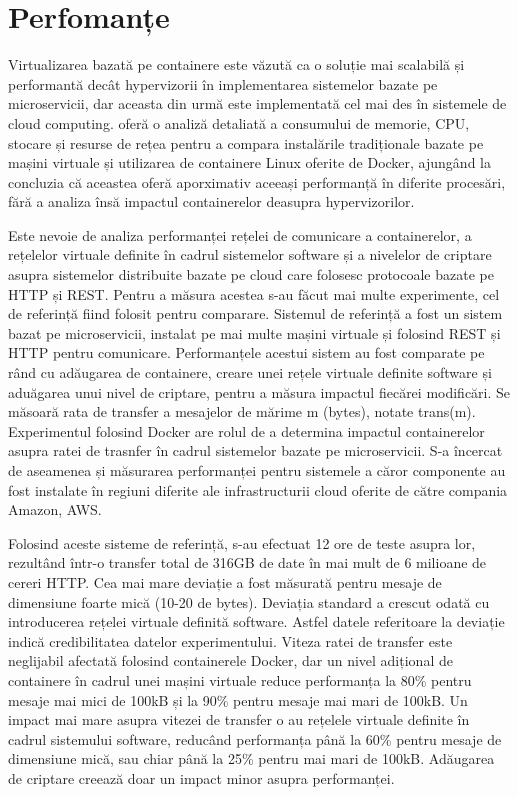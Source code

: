 \documentclass[12pt, a4paper, twocolumn]{article} %
\begin{document}
\section{Perfomanțe} Virtualizarea bazată pe containere este văzută ca o soluție mai scalabilă și performantă decât hypervizorii în implementarea sistemelor bazate pe microservicii, dar aceasta din urmă este implementată cel mai des în sistemele de cloud computing. \citep{felter2015updated} oferă o analiză detaliată a consumului de memorie, CPU, stocare și resurse de rețea pentru a compara instalările tradiționale bazate pe mașini virtuale și utilizarea de containere Linux oferite de Docker, ajungând la concluzia că aceastea oferă aporximativ aceeași performanță în diferite procesări, fără a analiza însă impactul containerelor deasupra hypervizorilor.\par Este nevoie de analiza performanței rețelei de comunicare a containerelor, a rețelelor virtuale definite în cadrul sistemelor software și a nivelelor de criptare asupra sistemelor distribuite bazate pe cloud care folosesc protocoale bazate pe HTTP și REST. Pentru a măsura acestea s-au făcut mai multe experimente, cel de referință fiind folosit pentru comparare. Sistemul de referință a fost un sistem bazat pe microservicii, instalat pe mai multe mașini virtuale și folosind REST și HTTP pentru comunicare. Performanțele acestui sistem au fost comparate pe rând cu adăugarea de containere, creare unei rețele virtuale definite software și aduăgarea unui nivel de criptare, pentru a măsura impactul fiecărei modificări. Se măsoară rata de transfer a mesajelor de mărime m (bytes), notate trans(m). Experimentul folosind Docker are rolul de a determina impactul containerelor asupra ratei de trasnfer în cadrul sistemelor bazate pe microservicii. S-a încercat de aseamenea și măsurarea performanței pentru sistemele a căror componente au fost instalate în regiuni diferite ale infrastructurii cloud oferite de către compania Amazon, AWS. 
\par Folosind aceste sisteme de referință, s-au efectuat 12 ore de teste asupra lor, rezultând într-o transfer total de 316GB de date în mai mult de 6 milioane de cereri HTTP. Cea mai mare deviație a fost măsurată pentru mesaje de dimensiune foarte mică (10-20 de bytes). Deviația standard a crescut odată cu introducerea rețelei virtuale definită software. Astfel datele referitoare la deviație indică credibilitatea datelor experimentului. Viteza ratei de transfer este neglijabil afectată folosind containerele Docker, dar un nivel adițional de containere în cadrul unei mașini virtuale reduce performanța la 80\% pentru mesaje mai mici de 100kB și la 90\% pentru mesaje mai mari de 100kB. Un impact mai mare asupra vitezei de transfer o au rețelele virtuale definite în cadrul sistemului software, reducând performanța până la 60\% pentru mesaje de dimensiune mică, sau chiar până la 25\% pentru mai mari de 100kB. Adăugarea de criptare creează doar un impact minor asupra performanței.
\end{document}
